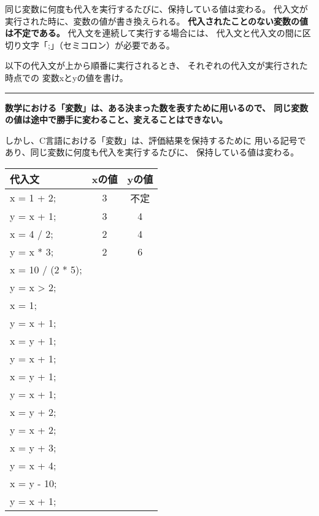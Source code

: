 \documentclass[12pt,a4j]{jarticle}
\begin{document}
\begin{multicols}{2}
 
 同じ変数に何度も代入を実行するたびに、保持している値は変わる。
 代入文が実行された時に、変数の値が書き換えられる。
 {\bfseries 代入されたことのない変数の値は不定である。}
 代入文を連続して実行する場合には、
 代入文と代入文の間に区切り文字「{\ttfamily ;}」（セミコロン）が必要である。

 以下の代入文が上から順番に実行されるとき、
 それぞれの代入文が実行された時点での
 変数{\ttfamily x}と{\ttfamily y}の値を書け。

 \vfill

 \bigskip\bigskip
 
\noindent\rule{\linewidth}{.1pt}

{\bfseries
数学における「変数」は、ある決まった数を表すために用いるので、
同じ変数の値は途中で勝手に変わること、変えることはできない。

しかし、C言語における「変数」は、評価結果を保持するために
用いる記号であり、同じ変数に何度も代入を実行するたびに、
保持している値は変わる。
}


 \begin{center}
 \ttfamily%
 \begin{tabular}{|l|c|c|}\hline
 代入文 & xの値 & yの値\\ \hline\hline
 x = 1 + 2; & 3 & 不定 \\ \cline{2-3}
 y = x + 1; & 3 & 4 \\ \cline{2-3}
 x = 4 / 2; & 2 & 4 \\ \cline{2-3}
 y = x * 3; & 2 & 6 \\ \cline{2-3}
 x = 10 / (2 * 5); & &  \\ \cline{2-3}
 y = x > 2; & &  \\ \cline{2-3}
 x = 1; & &  \\  \cline{2-3}
 y = x + 1; & &  \\  \cline{2-3}
 x = y + 1; & &  \\  \cline{2-3}
 y = x + 1; & &  \\  \cline{2-3}
 x = y + 1; & &  \\  \cline{2-3}
 y = x + 1; & &  \\  \cline{2-3}
 x = y + 2; & &  \\  \cline{2-3}
 y = x + 2; & &  \\  \cline{2-3}
 x = y + 3; & &  \\  \cline{2-3}
 y = x + 4; & &  \\  \cline{2-3}
 x = y - 10; & &  \\  \cline{2-3}
 y = x + 1; & &  \\ \hline
 \end{tabular}
 \end{center}

\end{multicols}
\end{document}
